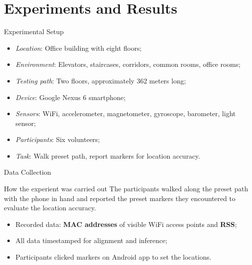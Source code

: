 \section[Results]{Experiments and Results}
\begin{frame}{Experimental Setup}
    \begin{itemize}
        \item \textit{Location}: Office building with eight floors;
        \item \textit{Environment}: Elevators, staircases, corridors, common rooms, office rooms;
        \item \textit{Testing path}: Two floors, approximately 362 meters long;
        \item \textit{Device}: Google Nexus 6 smartphone;
        \item \textit{Sensors}: WiFi, accelerometer, magnetometer, gyroscope, barometer, light sensor;
        \item \textit{Participants}: Six volunteers;
        \item \textit{Task}: Walk preset path, report markers for location accuracy.
    \end{itemize}
\end{frame}

\begin{frame}{Data Collection}
    \begin{block}{How the experient was carried out}
        The participants walked along the preset path with the phone in hand and reported the preset markers they encountered to evaluate the location accuracy.
    \end{block}
    \begin{itemize}
        \item Recorded data: \textbf{MAC addresses} of visible WiFi access points and \textbf{RSS};
        \item All data timestamped for alignment and inference;
        \item Participants clicked markers on Android app to set the locations.
    \end{itemize}
\end{frame}

